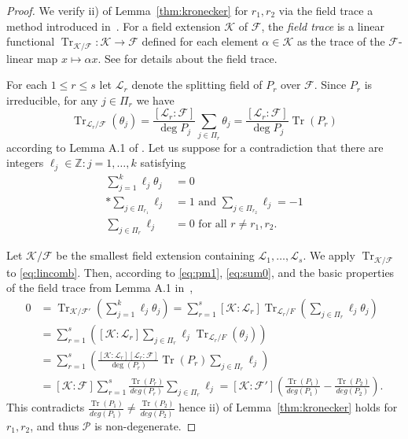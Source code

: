 \documentclass[11pt]{article}
\theoremstyle{definition}
\numberwithin{equation}{section}
\newcommand\+{\mkern2mu}
\newcommand{\Z}{\mathbb{Z}}
\newcommand{\F}{\mathcal{F}}
\newcommand{\1}{\mathbf 1}
\DeclareMathOperator{\Tr}{Tr}
\begin{document}
\begin{proof}
We verify ii) of Lemma~\ref{thm:kronecker} for $r_1,r_2$ via the field trace a method introduced in~\cite{invol}. For a field extension $\mathcal{K}$ of $\mathcal{F}$, the \emph{field trace} is a linear functional $\Tr_{\mathcal K/\mathcal F}: \mathcal K \rightarrow \mathcal F$  defined for each element  $\alpha \in \mathcal{K}$ as the trace of the $\mathcal{F}$-linear map $x\mapsto \alpha x$. See \cite{lang_book} for details about the field trace.

For each $1\leq r \leq s$ let  $\mathcal{L}_r$ denote the splitting field of $P_r$ over $\F$. Since $P_r$ is irreducible, for any $j \in \Pi_r$ we have 
\[ \Tr_{\mathcal{L}_r / \F}(\theta_j) = \frac{[\mathcal L_r:\mathcal{F}]}{\deg P_j}\sum_{j \in \Pi_r} \theta_j =  \frac{[\mathcal L_r:\mathcal{F}]}{\deg P_j} \Tr(P_r)\]
according to Lemma A.1 of \cite{eisenberg2019pretty}.
Let us suppose for a contradiction that there are integers $\ell_j \in \Z : j=1,\dots, k$ satisfying 
\begin{align}
\sum_{j=1}^k\ell_j \theta_j &= 0 \label{eq:lincomb}\\*
\sum_{j \in \Pi_{r_1}} \ell_j &= 1 \text{ and } \sum_{j \in \Pi_{r_2}} \ell_j = -1\label{eq:pm1}\\
\sum_{j \in \Pi_r} \ell_j &=0 \text{ for all } r \neq r_1, r_2. \label{eq:sum0}
\end{align}

Let $\mathcal K/\mathcal F$ be the smallest field extension containing $\mathcal L_1,\ldots,\mathcal L_s$. We apply $\Tr_{\mathcal{K}/\F}$ to \eqref{eq:lincomb}. Then, according to \eqref{eq:pm1},  \eqref{eq:sum0}, and the basic properties of the field trace from Lemma A.1 in~\cite{eisenberg2019pretty},
\begin{align*}
0&=\Tr_{\mathcal K/\mathcal F'}\left( \sum_{j=1}^k \ell_j \theta_j \right) = \sum_{r=1}^s[\mathcal K:\mathcal L_r]\Tr_{\mathcal L_r/F}\left(\sum_{j \in \Pi_r} \ell_j \theta_j \right)\\
&=\sum_{r=1}^s\left([\mathcal K:\mathcal L_r] \sum_{j \in \Pi_r} \ell_j \Tr_{\mathcal L_r/F}\left(\theta_j \right)\right)\\ 
&=\sum_{r=1}^s\left(\frac{[\mathcal K:\mathcal L_r][\mathcal L_r:\mathcal F]}{\deg(P_r)}\Tr(P_r)\sum_{j \in \Pi_r} \ell_j \right)\\
&=[\mathcal K:\mathcal F]\sum_{r=1}^s\frac{\Tr(P_r)}{deg(P_r)}\sum_{j \in \Pi_r} \ell_j 
=[\mathcal K:\mathcal F']\left(\frac{\Tr(P_1)}{deg(P_1)}-\frac{\Tr(P_2)}{deg(P_2)}\right).
\end{align*}
This contradicts $\frac{\Tr(P_1)}{deg(P_1)} \neq \frac{\Tr(P_2)}{deg(P_2)}$ hence ii) of Lemma~\ref{thm:kronecker} holds for $r_1,r_2$, and thus $\mathcal{P}$ is non-degenerate.

\end{proof}
\end{document}
